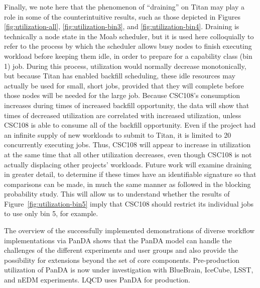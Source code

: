 Finally, we note here that the phenomenon of ``draining'' on Titan may play a
role in some of the counterintuitive results, such as those depicted in
Figures \ref{fig:utilization-all}, \ref{fig:utilization-bin3}, and
\ref{fig:utilization-bin4}. Draining is technically a node state in the Moab
scheduler, but it is used here colloquially to refer to the process by which
the scheduler allows busy nodes to finish executing workload before keeping
them idle, in order to prepare for a capability class (bin 1) job. During this
process, utilization would normally decrease monotonically, but because Titan
has enabled backfill scheduling, these idle resources may actually be used for
small, short jobs, provided that they will complete before those nodes will be
needed for the large job. Because CSC108's consumption increases during times
of increased backfill opportunity, the data will show that times of decreased
utilization are correlated with increased utilization, unless CSC108 is able
to consume all of the backfill opportunity. Even if the project had an
infinite supply of new workloads to submit to Titan, it is limited to 20
concurrently executing jobs. Thus, CSC108 will appear to increase in
utilization at the same time that all other utilization decreases, even though
CSC108 is not actually displacing other projects' workloads. Future work will
examine draining in greater detail, to determine if these times have an
identifiable signature so that comparisons can be made, in much the same
manner as followed in the blocking probability study. This will allow us to
understand whether the results of Figure~\ref{fig:utilization-bin5} imply that
CSC108 should restrict its individual jobs to use only bin 5, for example.


The overview of the successfully implemented demonstrations of diverse
workflow implementations via PanDA shows that the PanDA model can handle the
challenges of the different experiments and user groups and also provide the
possibility for extensions beyond the set of core components. Pre-production
utilization of PanDA is now under investigation with BlueBrain, IceCube, LSST,
and nEDM experiments. LQCD uses PanDA for production.

